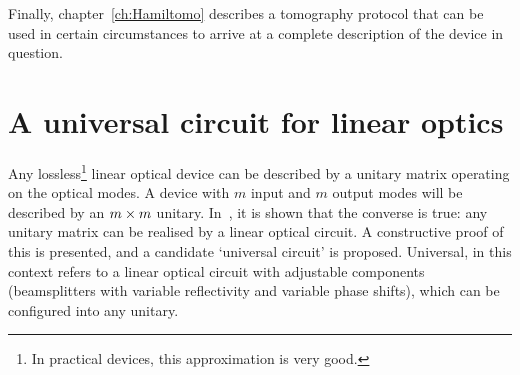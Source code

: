 Finally, chapter~\ref{ch:Hamiltomo} describes a tomography protocol that can be
used in certain circumstances to arrive at a complete description of the device
in question.

\section{A universal circuit for linear optics}
\label{sec:ReckScheme}
Any lossless\footnote{In practical devices, this approximation is very good.
} linear optical device can be
described by a unitary matrix operating on the optical modes. A device with
\(m\) input and \(m\) output modes will be described by an \(m \times m\) unitary.
In~\cite{reck94}, it is shown that the converse is true: any unitary matrix can
be realised by a linear optical circuit. A constructive proof of this is
presented, and a candidate `universal circuit' is proposed. Universal, in this
context refers to a linear optical circuit with adjustable components
(beamsplitters with variable reflectivity and variable phase shifts), which can
be configured into any unitary.

